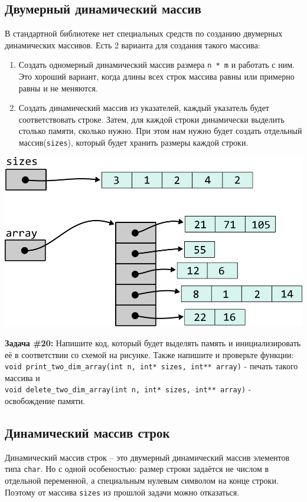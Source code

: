 \documentclass{article}
\begin{document}
\subsection*{Двумерный динамический массив}
В стандартной библиотеке нет специальных средств по созданию
двумерных динамических массивов. Есть 2 варианта для создания
такого массива:
\begin{enumerate}
\item Создать одномерный динамический массив размера \texttt{n * m} и работать с ним.
Это хороший вариант, когда длины всех строк массива равны или примерно равны и не меняются.
\item Создать динамический массив из указателей, каждый указатель будет 
соответствовать строке. Затем, для каждой строки динамически выделить столько памяти,
сколько нужно. При этом нам нужно будет создать отдельный массив(\texttt{sizes}), который будет хранить
размеры каждой строки.
\end{enumerate}
\begin{center}
\includegraphics[scale=1]{../../images/pointer_schemes/two_dim_dynamic_array.png}
\end{center}
\textbf{Задача \#20:} Напишите код, который будет выделять память и инициализировать её в соответствии 
со схемой на рисунке. Также напишите и проверьте функции: \\
\texttt{void print\_two\_dim\_array(int n, int* sizes, int** array)} - печать такого массива и\\
\texttt{void delete\_two\_dim\_array(int n, int* sizes, int** array)} - освобождение памяти.

\newpage
\subsection*{Динамический массив строк}
Динамический массив строк -- это двумерный динамический массив элементов типа \texttt{char}. 
Но с одной особеностью: размер строки задаётся не числом в отдельной переменной, 
а специальным нулевым символом на конце строки. Поэтому от массива \texttt{sizes}
из прошлой задачи можно отказаться.\\
\end{document}
